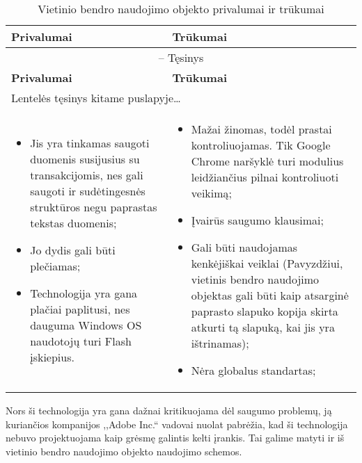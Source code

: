 \documentclass[12pt,a4paper,titlepage]{article}
\begin{document}
\begin{longtable}{|p{6.4cm}|p{6.4cm}|}
\caption{Vietinio bendro naudojimo objekto privalumai ir trūkumai \label{table:flash}}\\

\hline \hline
{\textbf{Privalumai}} &
{\textbf{Trūkumai}}\\
\hline
\endfirsthead


\multicolumn{2}{c}{{\tablename} \thetable{} -- Tęsinys} \\[0.5ex]
\hline \hline
{\textbf{Privalumai}} &
{\textbf{Trūkumai}}\\
\hline
\endhead


\multicolumn{2}{l}{{Lentelės tęsinys kitame puslapyje\ldots}} \\
\endfoot


\hline \hline
\endlastfoot
\hline 
\begin{itemize}
  \item Jis yra tinkamas saugoti duomenis susijusius su transakcijomis, nes gali saugoti ir sudėtingesnės struktūros negu paprastas tekstas duomenis;
  \item Jo dydis gali būti plečiamas;
  \item Technologija yra gana plačiai paplitusi, nes dauguma Windows OS naudotojų turi Flash įskiepius.
\end{itemize}
&
\begin{itemize}
  \item Mažai žinomas, todėl prastai kontroliuojamas. Tik Google Chrome naršyklė turi modulius leidžiančius pilnai kontroliuoti veikimą;
  \item Įvairūs saugumo klausimai;
  \item Gali būti naudojamas kenkėjiškai veiklai (Pavyzdžiui, vietinis bendro naudojimo objektas gali būti kaip atsarginė paprasto slapuko kopija skirta atkurti tą slapuką, kai jis yra ištrinamas);
  \item Nėra globalus standartas;
\end{itemize}
\end{longtable}
Nors ši technologija yra gana dažnai kritikuojama dėl saugumo problemų, ją kuriančios kompanijos ,,Adobe Inc.`` vadovai nuolat pabrėžia, kad ši technologija nebuvo projektuojama kaip grėsmę galintis kelti įrankis. Tai galime matyti ir iš vietinio bendro naudojimo objekto naudojimo schemos.
\end{document}
